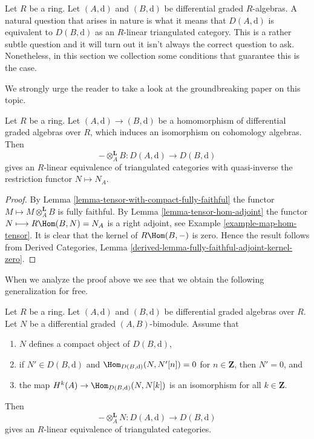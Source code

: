 \noindent
Let $R$ be a ring. Let $(A, \text{d})$ and $(B, \text{d})$ be differential
graded $R$-algebras. A natural question that arises in nature is what
it means that $D(A, \text{d})$ is equivalent to $D(B, \text{d})$
as an $R$-linear triangulated category. This is a rather subtle question
and it will turn out it isn't always the correct question to ask.
Nonetheless, in this section we collection some conditions
that guarantee this is the case.

\medskip\noindent
We strongly urge the reader to take a look at the groundbreaking
paper \cite{Rickard} on this topic.

\begin{lemma}
\label{lemma-qis-equivalence}
Let $R$ be a ring. Let $(A, \text{d}) \to (B, \text{d})$ be a
homomorphism of differential graded algebras over $R$, which induces
an isomorphism on cohomology algebras. Then
$$
- \otimes_A^\mathbf{L} B : D(A, \text{d}) \to D(B, \text{d})
$$
gives an $R$-linear equivalence of triangulated categories with
quasi-inverse the restriction functor $N \mapsto N_A$.
\end{lemma}

\begin{proof}
By Lemma \ref{lemma-tensor-with-compact-fully-faithful}
the functor $M \longmapsto M \otimes_A^\mathbf{L} B$ is
fully faithful. By Lemma \ref{lemma-tensor-hom-adjoint}
the functor $N \longmapsto R\Hom(B, N) = N_A$ is a right adjoint, see
Example \ref{example-map-hom-tensor}.
It is clear that the kernel of $R\Hom(B, -)$ is zero.
Hence the result follows from
Derived Categories, Lemma
\ref{derived-lemma-fully-faithful-adjoint-kernel-zero}.
\end{proof}

\noindent
When we analyze the proof above we see that we obtain the
following generalization for free.

\begin{lemma}
\label{lemma-tilting-equivalence}
Let $R$ be a ring. Let $(A, \text{d})$ and $(B, \text{d})$ be 
differential graded algebras over $R$. Let $N$ be a
differential graded $(A, B)$-bimodule. Assume that
\begin{enumerate}
\item $N$ defines a compact object of $D(B, \text{d})$,
\item if $N' \in D(B, \text{d})$ and
$\Hom_{D(B, \text{d})}(N, N'[n]) = 0$ for $n \in \mathbf{Z}$,
then $N' = 0$, and
\item the map $H^k(A) \to \Hom_{D(B, \text{d})}(N, N[k])$ is an
isomorphism for all $k \in \mathbf{Z}$.
\end{enumerate}
Then
$$
- \otimes_A^\mathbf{L} N : D(A, \text{d}) \to D(B, \text{d})
$$
gives an $R$-linear equivalence of triangulated categories.
\end{lemma}

